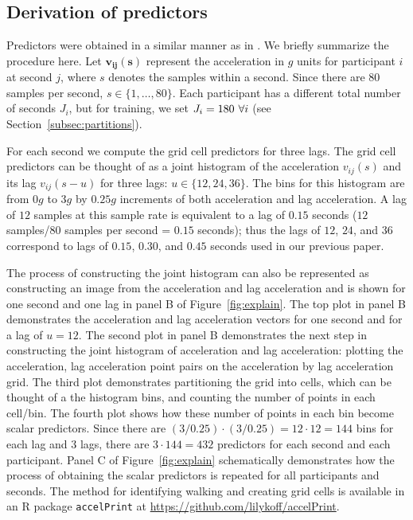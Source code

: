 \subsection{Derivation of predictors}
Predictors were obtained in a similar manner as in \citep{Koffman2024}. We briefly summarize the procedure here. Let $\mathbf{v_{ij}(s)}$ represent the acceleration in $g$ units for participant $i$ at second $j$, where $s$ denotes the samples within a second. Since there are 80 samples per second, $s \in \{1, \dots, 80\}$. Each participant has a different total number of seconds $J_i$, but for training, we set $J_i = 180 \hspace{.05in} \forall i$ (see Section~\ref{subsec:partitions}). 

For each second we compute the grid cell predictors for three lags. The grid cell predictors can be thought of as a joint histogram of the acceleration $v_{ij}(s)$ and its lag $v_{ij}(s-u)$ for three lags: $u \in \{12, 24, 36\}$. The bins for this histogram are from $0g$ to $3g$ by $0.25g$ increments of both acceleration and lag acceleration. A lag of $12$ samples at this sample rate is equivalent to a lag of $0.15$ seconds ($12$ samples/$80$ samples per second = $0.15$ seconds); thus the lags of $12$, $24$, and $36$ correspond to lags of $0.15$, $0.30$, and $0.45$ seconds used in our previous paper. 

The process of constructing the joint histogram can also be represented as constructing an image from the acceleration and lag acceleration and is shown for one second and one lag in panel B of Figure~\ref{fig:explain}. The top plot in panel B demonstrates the acceleration and lag acceleration vectors for one second and for a lag of $u=12$. The second plot in panel B demonstrates the next step in constructing the joint histogram of acceleration and lag acceleration: plotting the acceleration, lag acceleration point pairs on the acceleration by lag acceleration grid. The third plot demonstrates partitioning the grid into cells, which can be thought of a the histogram bins, and counting the number of points in each cell/bin. The fourth plot shows how these number of points in each bin become scalar predictors. Since there are $(3/0.25)\cdot(3/0.25) = 12\cdot12 = 144$ bins for each lag and $3$ lags, there are $3\cdot144 = 432$ predictors for each second and each participant.  Panel C of Figure~\ref{fig:explain} schematically demonstrates how the process of obtaining the scalar predictors is repeated for all participants and seconds. The method for identifying walking and creating grid cells is available in an R package \texttt{accelPrint} at \url{https://github.com/lilykoff/accelPrint}. 

